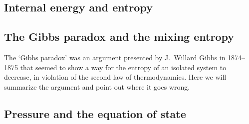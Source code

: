 



\newpage %
\subsection{Internal energy and entropy}



\newpage %
\subsection{The Gibbs paradox and the mixing entropy}
The `Gibbs paradox' was an argument presented by J.\ Willard Gibbs in 1874--1875 that seemed to show a way for the entropy of an isolated system to decrease, in violation of the second law of thermodynamics.
Here we will summarize the argument and point out where it goes wrong.




\newpage %
\subsection{Pressure and the equation of state}
